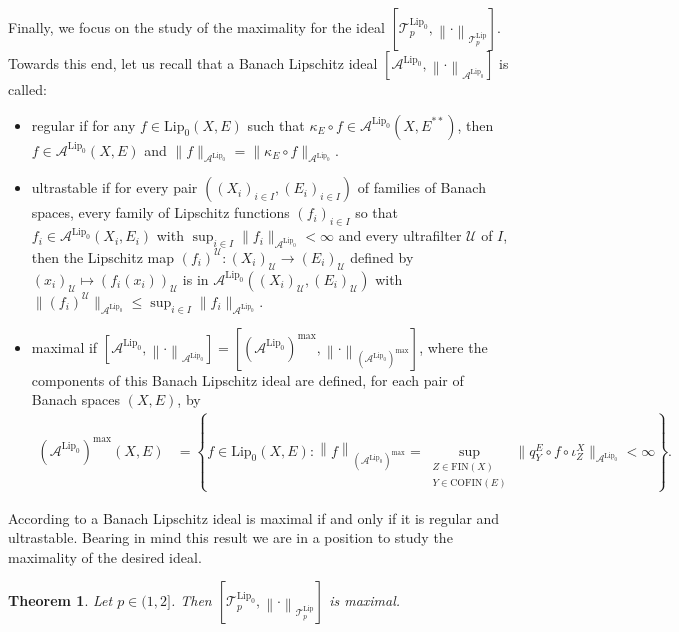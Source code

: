 \documentclass[12pt]{amsart}
\newtheorem{theorem}{Theorem}[section]
\def\A{\mathcal{A}}
\def\T{\mathcal{T}}
\def\Lip{\mathrm{Lip}_0}
\def\Lipnorm{\mathrm{Lip}}
\begin{document}
Finally, we focus on the study of the maximality for the ideal $[\T_p^{\Lip},\left\|\cdot\right\|_{\T_p^{\Lipnorm}}]$. Towards this end, let us recall that a Banach Lipschitz ideal $[\A^{\Lip},\left\|\cdot\right\|_{\A^{\Lip}}]$ is called:
\begin{itemize}
	\item[$(i)$] regular if for any $f \in \Lip(X,E)$ such that $\kappa_E \circ f \in \A^{\Lip}(X,E^{**})$, then $f \in \A^{\Lip}(X,E)$ and $\|f\|_{\A^{\Lip}} = \|\kappa_E \circ f\|_{\A^{\Lip}}$.
	\item[$(ii)$] ultrastable if for every pair $((X_i)_{i\in I},(E_i)_{i\in I})$ of families of Banach spaces, every family of Lipschitz functions $(f_i)_{i\in I}$ so that $f_i \in \A^{\Lip}(X_i,E_i)$ with $\sup_{i\in I} \|f_i\|_{\A^{\Lip}} < \infty$ and every ultrafilter $\mathcal{U}$ of $I$, then the Lipschitz map $(f_i)^{\mathcal{U}}: (X_i)_{\mathcal{U}} \to (E_i)_{\mathcal{U}}$ defined by $(x_i)_{\mathcal{U}} \mapsto (f_i(x_i))_{\mathcal{U}}$ is in $\A^{\Lip}((X_i)_{\mathcal{U}}, (E_i)_{\mathcal{U}})$ with $\|(f_i)^{\mathcal{U}}\|_{\A^{\Lip}} \leq \sup_{i\in I}\|f_i\|_{\A^{\Lip}}$.
	\item[$(iii)$] maximal if $[\A^{\Lip},\left\|\cdot\right\|_{\A^{\Lip}}] = [(\A^{\Lip})^{\mathrm{max}},\left\|\cdot\right\|_{(\A^{\Lip})^{\mathrm{max}}}]$, where the components of this Banach Lipschitz ideal are defined, for each pair of Banach spaces $(X,E)$, by
	\begin{align*}
	(\A^{\Lip})^{\mathrm{max}}(X,E) &= \left\{ f \in \Lip(X,E): \left\|f\right\|_{(\A^{\Lip})^{\mathrm{max}}}=\sup_{\substack{Z \in \mathrm{FIN}(X)\\ Y \in \mathrm{COFIN}(E)}} \|q_Y^E \circ f \circ \iota_Z^X\|_{\A^{\Lip}} <\infty \right\}.
	\end{align*}
\end{itemize}

According to \cite[Theorem 3.6]{AlbTur-24} a Banach Lipschitz ideal is maximal if and only if it is regular and ultrastable. Bearing in mind this result we are in a position to study the maximality of the desired ideal.

\begin{theorem}
	Let $p\in(1,2]$. Then $[\T_p^{\Lip},\left\|\cdot\right\|_{\T_p^{\Lipnorm}}]$ is maximal.
\end{theorem}
\end{document}
